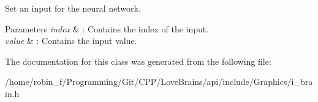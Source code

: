 Set an input for the neural network. 


\begin{DoxyParams}{Parameters}
{\em index} & \+: Contains the index of the input. \\
\hline
{\em value} & \+: Contains the input value. \\
\hline
\end{DoxyParams}


The documentation for this class was generated from the following file\+:\begin{DoxyCompactItemize}
\item 
/home/robin\+\_\+f/\+Programming/\+Git/\+C\+P\+P/\+Love\+Brains/api/include/\+Graphics/i\+\_\+brain.\+h\end{DoxyCompactItemize}
